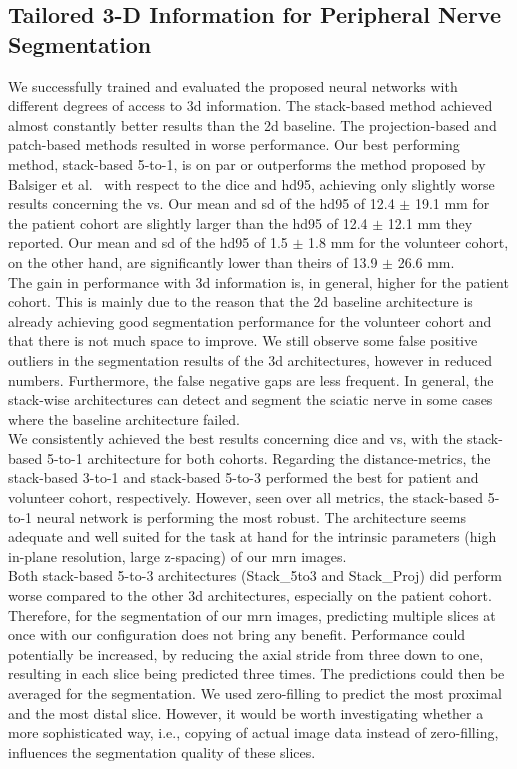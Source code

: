 \subsection{Tailored 3-D Information for Peripheral Nerve Segmentation}
We successfully trained and evaluated the proposed neural networks with different degrees of access to \gls{3d} information. The stack-based method achieved almost constantly better results than the \gls{2d} baseline. The projection-based and patch-based methods resulted in worse performance. Our best performing method, stack-based 5-to-1, is on par or outperforms the method proposed by Balsiger et al.~\cite{Balsiger2018SegmentationApproach} with respect to the \acrlong{dice} and \acrlong{hd95}, achieving only slightly worse results concerning the \acrlong{vs}. Our mean and \gls{sd} of the \gls{hd95} of 12.4 $\pm$ 19.1 mm for the patient cohort are slightly larger than the \gls{hd95} of 12.4 $\pm$ 12.1 mm they reported. Our mean and \gls{sd} of the \gls{hd95} of 1.5 $\pm$ 1.8 mm for the volunteer cohort, on the other hand, are significantly lower than theirs of 13.9 $\pm$ 26.6 mm.\\
The gain in performance with \gls{3d} information is, in general, higher for the patient cohort. This is mainly due to the reason that the \gls{2d} baseline architecture is already achieving good segmentation performance for the volunteer cohort and that there is not much space to improve. We still observe some false positive outliers in the segmentation results of the \gls{3d} architectures, however in reduced numbers. Furthermore, the false negative gaps are less frequent. In general, the stack-wise architectures can detect and segment the sciatic nerve in some cases where the baseline architecture failed.\\
We consistently achieved the best results concerning \acrlong{dice} and \acrlong{vs}, with the stack-based 5-to-1 architecture for both cohorts. Regarding the distance-metrics, the stack-based 3-to-1 and stack-based 5-to-3 performed the best for patient and volunteer cohort, respectively. However, seen over all metrics, the stack-based 5-to-1 neural network is performing the most robust. The architecture seems adequate and well suited for the task at hand for the intrinsic parameters (high in-plane resolution, large z-spacing) of our \gls{mrn} images.\\
Both stack-based 5-to-3 architectures (Stack\_5to3 and Stack\_Proj) did perform worse compared to the other \gls{3d} architectures, especially on the patient cohort. Therefore, for the segmentation of our \gls{mrn} images, predicting multiple slices at once with our configuration does not bring any benefit. Performance could potentially be increased, by reducing the axial stride from three down to one, resulting in each slice being predicted three times. The predictions could then be averaged for the segmentation. We used zero-filling to predict the most proximal and the most distal slice. However, it would be worth investigating whether a more sophisticated way, i.e., copying of actual image data instead of zero-filling, influences the segmentation quality of these slices.
